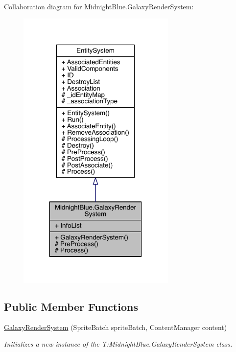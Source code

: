 Collaboration diagram for Midnight\+Blue.\+Galaxy\+Render\+System\+:\nopagebreak
\begin{figure}[H]
\begin{center}
\leavevmode
\includegraphics[width=221pt]{class_midnight_blue_1_1_galaxy_render_system__coll__graph}
\end{center}
\end{figure}
\subsection*{Public Member Functions}
\begin{DoxyCompactItemize}
\item 
\hyperlink{class_midnight_blue_1_1_galaxy_render_system_aee5d42f0287d1bfed669e2a2656c5c28}{Galaxy\+Render\+System} (Sprite\+Batch sprite\+Batch, Content\+Manager content)
\begin{DoxyCompactList}\small\item\em Initializes a new instance of the T\+:\+Midnight\+Blue.\+Galaxy\+Render\+System class. \end{DoxyCompactList}\end{DoxyCompactItemize}
